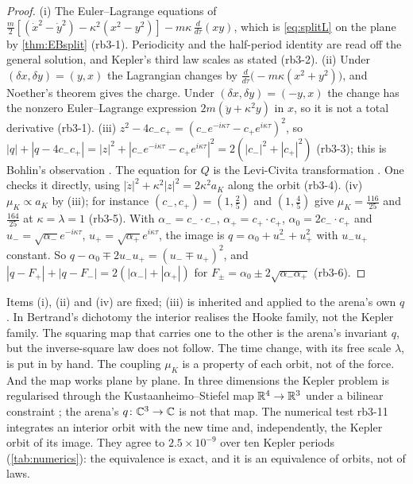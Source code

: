 \begin{proof}
(i) The Euler--Lagrange equations of $\tfrac m2[(\dot x^2-\dot y^2)-\kappa^2(x^2-y^2)]-m\kappa\,\tfrac{d}{d\tau}(xy)$, which is \eqref{eq:splitL}
on the plane by \cref{thm:EBsplit} (rb3-1). Periodicity and the half-period identity are read off the general solution, and Kepler's third law
scales as stated (rb3-2). (ii) Under $(\delta x,\delta y)=(y,x)$ the Lagrangian changes by $\tfrac{d}{d\tau}\bigl(-m\kappa(x^2+y^2)\bigr)$, and Noether's
theorem gives the charge. Under $(\delta x,\delta y)=(-y,x)$ the change has the nonzero Euler--Lagrange expression $2m(\ddot y+\kappa^2y)$ in
$x$, so it is not a total derivative (rb3-1). (iii) $z^2-4c_-c_+=(c_-e^{-i\kappa\tau}-c_+e^{i\kappa\tau})^2$, so
$|q|+|q-4c_-c_+|=|z|^2+|c_-e^{-i\kappa\tau}-c_+e^{i\kappa\tau}|^2=2(|c_-|^2+|c_+|^2)$ (rb3-3); this is Bohlin's observation \cite{Bohlin1911}. The equation
for $Q$ is the Levi-Civita transformation \cite{LeviCivita1920}. One checks it directly, using $|\dot z|^2+\kappa^2|z|^2=2\kappa^2a_K$ along the orbit
(rb3-4). (iv) $\mu_K\propto a_K$ by (iii); for instance $(c_-,c_+)=(1,\tfrac25)$ and $(1,\tfrac45)$ give $\mu_K=\tfrac{116}{25}$ and $\tfrac{164}{25}$ at
$\kappa=\lambda=1$ (rb3-5). With $\alpha_-=c_-\cdot c_-$, $\alpha_+=c_+\cdot c_+$, $\alpha_0=2c_-\cdot c_+$ and $u_-=\sqrt{\alpha_-}e^{-i\kappa\tau}$,
$u_+=\sqrt{\alpha_+}e^{i\kappa\tau}$, the image is $q=\alpha_0+u_-^2+u_+^2$ with $u_-u_+$ constant. So $q-\alpha_0\mp2u_-u_+=(u_-\mp u_+)^2$, and
$|q-F_+|+|q-F_-|=2(|\alpha_-|+|\alpha_+|)$ for $F_\pm=\alpha_0\pm2\sqrt{\alpha_-\alpha_+}$ (rb3-6).
\end{proof}

Items (i), (ii) and (iv) are fixed; (iii) is inherited and applied to the arena's own $q$ \cite{Bohlin1911,LeviCivita1920,ArnoldHuygens}.
In Bertrand's dichotomy the interior realises the Hooke family, not the Kepler family. The squaring map that carries one to the other is the
arena's invariant $q$, but the inverse-square law does not follow. The time change, with its free scale $\lambda$, is put in by hand. The coupling
$\mu_K$ is a property of each orbit, not of the force. And the map works plane by plane. In three dimensions the Kepler problem is regularised
through the Kustaanheimo--Stiefel map $\mathbb{R}^4\to\mathbb{R}^3$ under a bilinear constraint \cite{KustaanheimoStiefel65}; the arena's
$q\colon\mathbb{C}^3\to\mathbb{C}$ is not that map. The numerical test rb3-11 integrates an interior orbit with the new time and, independently, the
Kepler orbit of its image. They agree to $2.5\times10^{-9}$ over ten Kepler periods (\cref{tab:numerics}): the equivalence is exact, and it is
an equivalence of orbits, not of laws.

